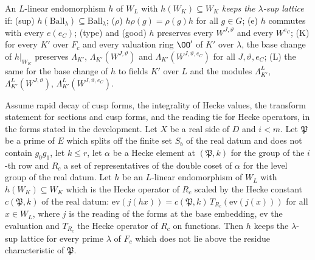 \begin{definition}\label{pf:baselat2:keeps}
An $L$-linear endomorphism $h$ of $W_L$ with $h(W_K)\subseteq W_K$ \emph{keeps the $\lambda$-sup lattice} if:
(sup) $h(\mathrm{Ball}_\lambda)\subseteq\mathrm{Ball}_\lambda$; ($\rho$) $h\rho(g)=\rho(g)h$ for all $g\in G$; (e) $h$ commutes with
every $e(e_C)$; (type) and (good) $h$ preserves every $W^{J,\vartheta}$ and every $W^{e_C}$; (K) for every $K'$ over
$F_c$ and every valuation ring $\OO'$ of $K'$ over $\lambda$, the base change of $h|_{W_K}$ preserves $\Lambda_{K'}$,
$\Lambda_{K'}(W^{J,\vartheta})$ and $\Lambda_{K'}(W^{J,\vartheta,e_C})$ for all $J,\vartheta,e_C$; (L) the same for the base change of $h$
to fields $K'$ over $L$ and the modules $\Lambda^L_{K'}$, $\Lambda^L_{K'}(W^{J,\vartheta})$, $\Lambda^L_{K'}(W^{J,\vartheta,e_C})$.
\end{definition}

\begin{theorem}\label{pf:baselat2:hecke}
Assume rapid decay of cusp forms, the integrality of Hecke values, the transform statement for sections and
cusp forms, and the reading tie for Hecke operators, in the forms stated in the development. Let $X$ be a
real side of $D$ and $i<m$. Let $\mathfrak P$ be a prime of $E$ which splits off the finite set $S_b$ of the real datum
and does not contain $g_0g_1$, let $k\le r$, let $\alpha$ be a Hecke element at $(\mathfrak P,k)$ for the group of the
$i$-th row and $R_c$ a set of representatives of the double coset of $\alpha$ for the level group of the real datum.
Let $h$ be an $L$-linear endomorphism of $W_L$ with $h(W_K)\subseteq W_K$ which is the Hecke operator of $R_c$ scaled
by the Hecke constant $c(\mathfrak P,k)$ of the real datum: $\mathrm{ev}(j(hx))=c(\mathfrak P,k)\,T_{R_c}(\mathrm{ev}(j(x)))$ for all
$x\in W_L$, where $j$ is the reading of the forms at the base embedding, $\mathrm{ev}$ the evaluation and $T_{R_c}$ the
Hecke operator of $R_c$ on functions. Then $h$ keeps the $\lambda$-sup lattice for every prime $\lambda$ of $F_c$ which
does not lie above the residue characteristic of $\mathfrak P$.
\end{theorem}


